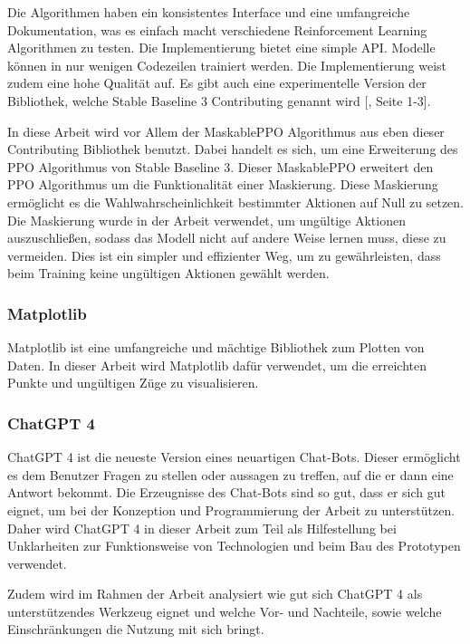 Die Algorithmen haben ein konsistentes Interface und eine umfangreiche Dokumentation, was es einfach macht verschiedene Reinforcement Learning Algorithmen zu testen. Die Implementierung bietet eine simple API. Modelle können in nur wenigen Codezeilen trainiert werden. Die Implementierung weist zudem eine hohe Qualität auf. Es gibt auch eine experimentelle Version der Bibliothek, welche Stable Baseline 3 Contributing genannt wird [\cite{noauthor_stable-baselines3_nodate}, Seite 1-3].

In diese Arbeit wird vor Allem der MaskablePPO Algorithmus aus eben dieser Contributing Bibliothek benutzt. Dabei handelt es sich, um eine Erweiterung des PPO Algorithmus von Stable Baseline 3. Dieser MaskablePPO erweitert den PPO Algorithmus um die Funktionalität einer Maskierung. Diese Maskierung ermöglicht es die Wahlwahrscheinlichkeit bestimmter Aktionen auf Null zu setzen. Die Maskierung wurde in der Arbeit verwendet, um ungültige Aktionen auszuschließen, sodass das Modell nicht auf andere Weise lernen muss, diese zu vermeiden. Dies ist ein simpler und effizienter Weg, um zu gewährleisten, dass beim Training keine ungültigen Aktionen gewählt werden.
\subsubsection{Matplotlib}
Matplotlib ist eine umfangreiche und mächtige Bibliothek zum Plotten von Daten. In dieser Arbeit wird Matplotlib dafür verwendet, um die erreichten Punkte und ungültigen Züge zu visualisieren.
\subsubsection{ChatGPT 4}
ChatGPT 4 ist die neueste Version eines neuartigen Chat-Bots. Dieser ermöglicht es dem Benutzer Fragen zu stellen oder aussagen zu treffen, auf die er dann eine Antwort bekommt. Die Erzeugnisse des Chat-Bots sind so gut, dass er sich gut eignet, um bei der Konzeption und Programmierung der Arbeit zu unterstützen. Daher wird ChatGPT 4 in dieser Arbeit zum Teil als Hilfestellung bei Unklarheiten zur Funktionsweise von Technologien und beim Bau des Prototypen verwendet. 

Zudem wird im Rahmen der Arbeit analysiert wie gut sich ChatGPT 4 als unterstützendes Werkzeug eignet und welche Vor- und Nachteile, sowie welche Einschränkungen die Nutzung mit sich bringt.